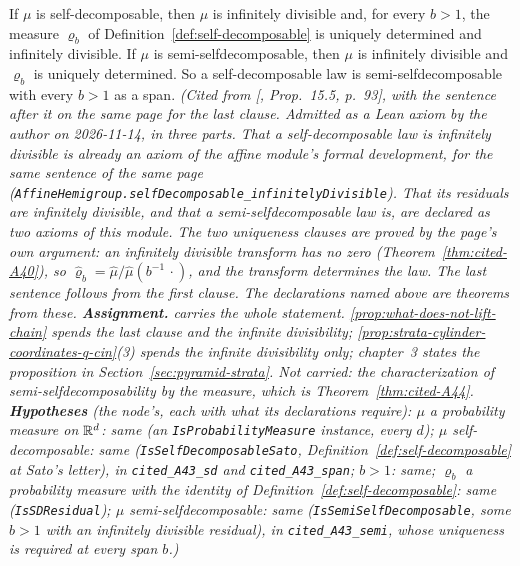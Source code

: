 \begin{theorem}
\label{thm:cited-A43}
\leanok
{}
If $\mu$ is self-decomposable, then $\mu$ is infinitely divisible and, for every $b > 1$, the
measure $\varrho_b$ of Definition~\ref{def:self-decomposable} is uniquely determined and infinitely
divisible. If $\mu$ is semi-selfdecomposable, then $\mu$ is infinitely divisible and $\varrho_b$ is
uniquely determined. So a self-decomposable law is semi-selfdecomposable with every $b > 1$ as a
span.
\statusA\quad{}\quad\emph{(Cited from [, Prop.~15.5, p.~93], with the
sentence after it on the same page for the last clause. Admitted as a Lean axiom by the author on
2026-11-14, in three parts. That a self-decomposable law is infinitely divisible is already an axiom
of the affine module's formal development, for the same sentence of the same page
(\texttt{AffineHemigroup.selfDecomposable\_infinitelyDivisible}). That its residuals are
infinitely divisible, and that a semi-selfdecomposable law is, are declared as two axioms of this
module. The two uniqueness clauses are proved by the page's own argument: an infinitely divisible
transform has no zero (Theorem~\ref{thm:cited-A40}), so $\widehat\varrho_b = \widehat\mu/\widehat\mu(b^{-1}\,\cdot)$,
and the transform determines the law. The last sentence follows from the first clause. The
declarations named above are theorems from these. \textbf{Assignment.}  carries the
whole statement.
\ref{prop:what-does-not-lift-chain} spends the last clause and the infinite divisibility;
\ref{prop:strata-cylinder-coordinates-q-cin}(3) spends the infinite divisibility only; chapter~3
states the proposition in Section~\ref{sec:pyramid-strata}. Not carried: the
characterization of semi-selfdecomposability by the \Levy{} measure, which is
Theorem~\ref{thm:cited-A44}.
\textbf{Hypotheses} (the node's, each with what its declarations require): $\mu$ a probability measure
on $\mathbb{R}^d$: same (an \texttt{IsProbabilityMeasure} instance, every $d$); $\mu$ self-decomposable:
same (\texttt{IsSelfDecomposableSato}, Definition~\ref{def:self-decomposable} at Sato's letter),
in \texttt{cited\_A43\_sd} and \texttt{cited\_A43\_span}; $b > 1$: same; $\varrho_b$ a probability
measure with the identity of Definition~\ref{def:self-decomposable}: same
(\texttt{IsSDResidual}); $\mu$ semi-selfdecomposable: same (\texttt{IsSemiSelfDecomposable}, some
$b > 1$ with an infinitely divisible residual), in \texttt{cited\_A43\_semi}, whose uniqueness is
required at every span $b$.)}
\end{theorem}

